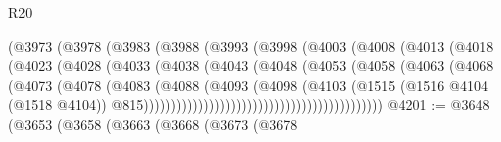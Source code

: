 \begin{lexlean}{R20}
\begin{coremodule}
{                                    (@3973
                                      (@3978
                                        (@3983
                                          (@3988
                                            (@3993
                                              (@3998
                                                (@4003
                                                  (@4008
                                                    (@4013
                                                      (@4018
                                                        (@4023
                                                          (@4028
                                                            (@4033
                                                              (@4038
                                                                (@4043
                                                                  (@4048
                                                                    (@4053
                                                                      (@4058
                                                                        (@4063
                                                                          (@4068
                                                                            (@4073
                                                                              (@4078
                                                                                (@4083
                                                                                  (@4088
                                                                                    (@4093
                                                                                      (@4098
                                                                                        (@4103
                                                                                          (@1515
                                                                                            (@1516
                                                                                              @4104
                                                                                              (@1518
                                                                                                @4104))
                                                                                            @815))))))))))))))))))))))))))))))))))))))))))))
@4201 := @3648
    (@3653
      (@3658
        (@3663
          (@3668
            (@3673
              (@3678
}
\end{coremodule}
\end{lexlean}
